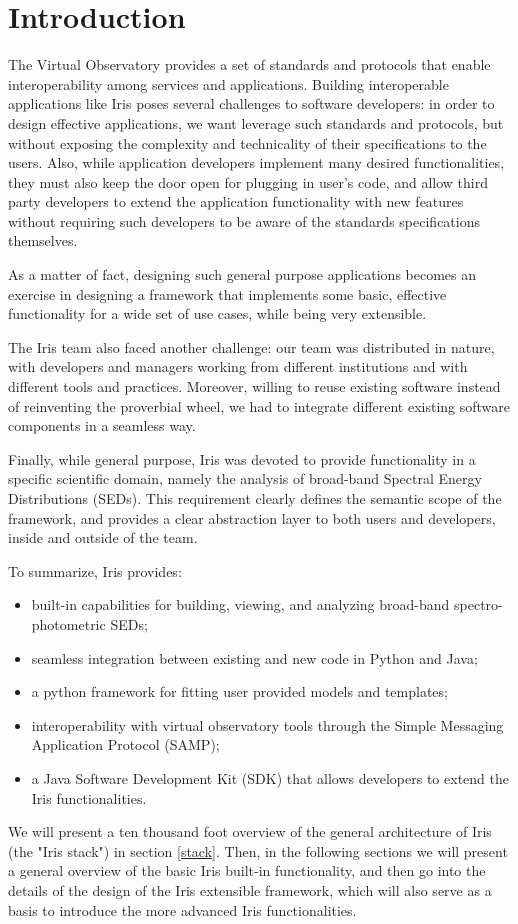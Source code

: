 \section{Introduction} 
The Virtual Observatory provides a set of standards and protocols that enable interoperability among services and applications. Building interoperable applications like Iris poses several challenges to software developers:  in order to design effective applications, we want leverage such standards and protocols, but without exposing the complexity and technicality of their specifications to the users. Also, while application developers implement many desired functionalities, they must also keep the door open for plugging in user's code, and allow third party developers to extend the application functionality with new features without requiring such developers to be aware of the standards specifications themselves.

As a matter of fact, designing such general purpose applications becomes an exercise in designing a framework that implements some basic, effective functionality for a wide set of use cases, while being very extensible.

The Iris team also faced another challenge: our team was distributed in nature, with developers and managers working from different institutions and with different tools and practices. Moreover, willing to reuse existing software instead of reinventing the proverbial wheel, we had to integrate different existing software components in a seamless way.

Finally, while general purpose, Iris was devoted to provide functionality in a specific scientific domain, namely the analysis of broad-band Spectral Energy Distributions (SEDs). This requirement clearly defines the semantic scope of the framework, and provides a clear abstraction layer to both users and developers, inside and outside of the team.

To summarize, Iris provides:
\begin{itemize}
\item built-in capabilities for building, viewing, and analyzing broad-band spectro-photometric SEDs;
\item seamless integration between existing and new code in Python and Java;
\item a python framework for fitting user provided models and templates;
\item interoperability with virtual observatory tools through the Simple Messaging Application Protocol (SAMP);
\item a Java Software Development Kit (SDK) that allows developers to extend the Iris functionalities.
\end{itemize}

We will present a ten thousand foot overview of the general architecture of Iris (the "Iris stack") in section \ref{stack}. Then, in the following sections we will present a general overview of the basic Iris built-in functionality, and then go into the details of the design of the Iris extensible framework, which will also serve as a basis to introduce the more advanced Iris functionalities.